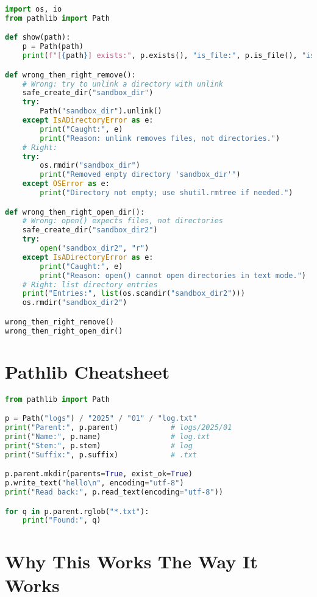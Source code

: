 \begin{lstlisting}[language=Python, caption={Demonstrate typical mistakes and show the fixes.}]
import os, io
from pathlib import Path

def show(path):
    p = Path(path)
    print(f"[{path}] exists:", p.exists(), "is_file:", p.is_file(), "is_dir:", p.is_dir())

def wrong_then_right_remove():
    # Wrong: try to unlink a directory with unlink
    safe_create_dir("sandbox_dir")
    try:
        Path("sandbox_dir").unlink()
    except IsADirectoryError as e:
        print("Caught:", e)
        print("Reason: unlink removes files, not directories.")
    # Right:
    try:
        os.rmdir("sandbox_dir")
        print("Removed empty directory 'sandbox_dir'")
    except OSError as e:
        print("Directory not empty; use shutil.rmtree if needed.")

def wrong_then_right_open_dir():
    # Wrong: open() expects files, not directories
    safe_create_dir("sandbox_dir2")
    try:
        open("sandbox_dir2", "r")
    except IsADirectoryError as e:
        print("Caught:", e)
        print("Reason: open() cannot open directories in text mode.")
    # Right: list directory entries
    print("Entries:", list(os.scandir("sandbox_dir2")))
    os.rmdir("sandbox_dir2")

wrong_then_right_remove()
wrong_then_right_open_dir()
\end{lstlisting}

\section{Pathlib Cheatsheet}

\begin{lstlisting}[language=Python, caption={Common pathlib operations, very readable.}]
from pathlib import Path

p = Path("logs") / "2025" / "01" / "log.txt"
print("Parent:", p.parent)            # logs/2025/01
print("Name:", p.name)                # log.txt
print("Stem:", p.stem)                # log
print("Suffix:", p.suffix)            # .txt

p.parent.mkdir(parents=True, exist_ok=True)
p.write_text("hello\n", encoding="utf-8")
print("Read back:", p.read_text(encoding="utf-8"))

for q in p.parent.rglob("*.txt"):
    print("Found:", q)
\end{lstlisting}

\section*{Why This Works The Way It Works}

